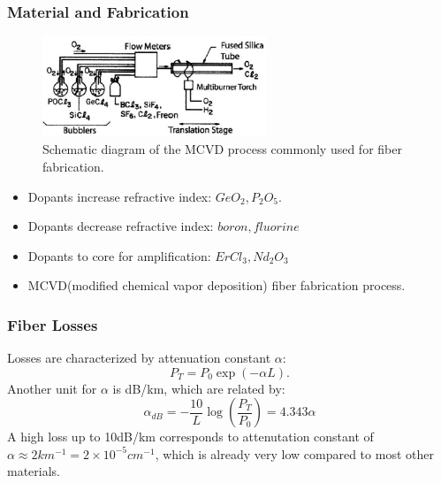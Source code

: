 \documentclass[12pt]{extarticle}
\numberwithin{equation}{section}
\numberwithin{figure}{section}
\numberwithin{table}{section}
\newcommand{\<}{\langle}
\renewcommand{\>}{\rangle}
\theoremstyle{definition}
\begin{document}
        \subsubsection{Material and Fabrication}
            \begin{figure}[htbp]
                \centering
                \includegraphics[width=0.6\textwidth]{images/fig1.2.PNG}
                \caption{Schematic diagram of the MCVD process commonly used for fiber fabrication.}
                \label{fig1.2}
            \end{figure}
            
            \begin{itemize}
                \item Dopants increase refractive index: $GeO_2, P_2O_5$.
                \item Dopants decrease refractive index: $boron, fluorine$
                \item Dopants to core for amplification: $ErCl_3, Nd_2O_3$
                \item MCVD(modified chemical vapor deposition) fiber fabrication process.
            \end{itemize}
            
        \subsubsection{Fiber Losses}
            Losses are characterized by attenuation constant $\alpha$:
                \begin{equation}
                    P_T = P_0 \exp{(-\alpha L)}.
                    \label{attenuation constant}
                \end{equation}
            Another unit for $\alpha$ is dB/km, which are related by:
                \begin{equation}
                    \alpha_{dB} = -\frac{10}{L}\log{(\frac{P_T}{P_0})} = 4.343\alpha
                \end{equation}
            A high loss up to 10dB/km corresponds to attenutation constant of \\
            $\alpha \approx 2 km^{-1} = 2\times 10^{-5}cm^{-1} $,
            which is already very low compared to most other materials.
            
\end{document}
